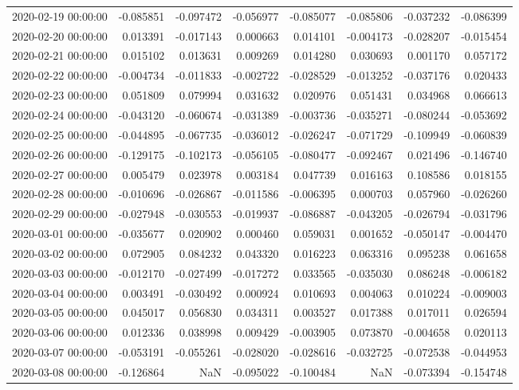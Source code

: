 \begin{tabular}{lrrrrrrr}
2020-02-19 00:00:00 & -0.085851 & -0.097472 & -0.056977 & -0.085077 & -0.085806 & -0.037232 & -0.086399 \\
2020-02-20 00:00:00 & 0.013391 & -0.017143 & 0.000663 & 0.014101 & -0.004173 & -0.028207 & -0.015454 \\
2020-02-21 00:00:00 & 0.015102 & 0.013631 & 0.009269 & 0.014280 & 0.030693 & 0.001170 & 0.057172 \\
2020-02-22 00:00:00 & -0.004734 & -0.011833 & -0.002722 & -0.028529 & -0.013252 & -0.037176 & 0.020433 \\
2020-02-23 00:00:00 & 0.051809 & 0.079994 & 0.031632 & 0.020976 & 0.051431 & 0.034968 & 0.066613 \\
2020-02-24 00:00:00 & -0.043120 & -0.060674 & -0.031389 & -0.003736 & -0.035271 & -0.080244 & -0.053692 \\
2020-02-25 00:00:00 & -0.044895 & -0.067735 & -0.036012 & -0.026247 & -0.071729 & -0.109949 & -0.060839 \\
2020-02-26 00:00:00 & -0.129175 & -0.102173 & -0.056105 & -0.080477 & -0.092467 & 0.021496 & -0.146740 \\
2020-02-27 00:00:00 & 0.005479 & 0.023978 & 0.003184 & 0.047739 & 0.016163 & 0.108586 & 0.018155 \\
2020-02-28 00:00:00 & -0.010696 & -0.026867 & -0.011586 & -0.006395 & 0.000703 & 0.057960 & -0.026260 \\
2020-02-29 00:00:00 & -0.027948 & -0.030553 & -0.019937 & -0.086887 & -0.043205 & -0.026794 & -0.031796 \\
2020-03-01 00:00:00 & -0.035677 & 0.020902 & 0.000460 & 0.059031 & 0.001652 & -0.050147 & -0.004470 \\
2020-03-02 00:00:00 & 0.072905 & 0.084232 & 0.043320 & 0.016223 & 0.063316 & 0.095238 & 0.061658 \\
2020-03-03 00:00:00 & -0.012170 & -0.027499 & -0.017272 & 0.033565 & -0.035030 & 0.086248 & -0.006182 \\
2020-03-04 00:00:00 & 0.003491 & -0.030492 & 0.000924 & 0.010693 & 0.004063 & 0.010224 & -0.009003 \\
2020-03-05 00:00:00 & 0.045017 & 0.056830 & 0.034311 & 0.003527 & 0.017388 & 0.017011 & 0.026594 \\
2020-03-06 00:00:00 & 0.012336 & 0.038998 & 0.009429 & -0.003905 & 0.073870 & -0.004658 & 0.020113 \\
2020-03-07 00:00:00 & -0.053191 & -0.055261 & -0.028020 & -0.028616 & -0.032725 & -0.072538 & -0.044953 \\
2020-03-08 00:00:00 & -0.126864 & NaN & -0.095022 & -0.100484 & NaN & -0.073394 & -0.154748 \\

\end{tabular}
